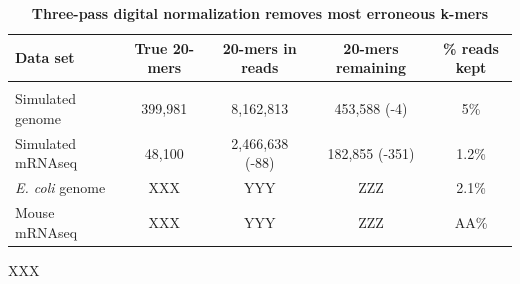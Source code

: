 \documentclass[10pt]{article}
\begin{document}
\begin{table}[!ht]
\caption{
\bf{Three-pass digital normalization removes most erroneous k-mers}}
\begin{tabular}{|l|c|c|c|c|}
Data set & True 20-mers & 20-mers in reads & 20-mers remaining & \% reads kept\\
\hline \\
Simulated genome & 399,981 & 8,162,813 & 453,588 (-4) & 5\% \\
Simulated mRNAseq & 48,100 & 2,466,638 (-88) & 182,855 (-351) & 1.2\% \\
{\em E. coli} genome & XXX & YYY & ZZZ & 2.1\% \\
Mouse mRNAseq & XXX & YYY & ZZZ & AA\% \\
\end{tabular}
\begin{flushleft} XXX
\end{flushleft}
\label{tab:normC5}
\end{table}
\end{document}
